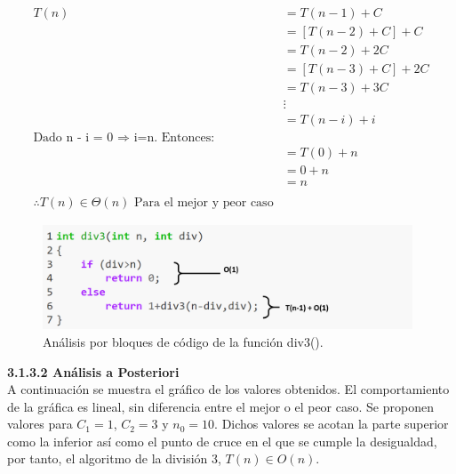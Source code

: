 \documentclass[12pt,twoside]{article}
\begin{document}
                \begin{align}
                \nonumber
                T(n)&=T(n-1)+C\nonumber\\
                &=[T(n-2)+C]+C\nonumber\\
                &=T(n-2)+2C\nonumber\\
                &=[T(n-3)+C]+2C\nonumber\\
                &=T(n-3)+3C\nonumber\\
                &\vdots\nonumber\\
                &=T(n-i)+i\nonumber\\
                \text{Dado n - i = 0 $\Rightarrow$ i=n. Entonces: }\nonumber\\
                &=T(0)+n\nonumber\\
                &=0+n\nonumber\\
                &=n\nonumber\\ \\
                \therefore T(n) \in \Theta(n) \text{ Para el mejor y peor caso}\nonumber
                \end{align}
                
                
                \begin{figure}[H]
                    \centering
                    \includegraphics[width=11cm]{imagenes/divc3.png}
                    \caption{Análisis por bloques de código de la función div3().}
                \end{figure}
                
                \newpage
                {\bf 3.1.3.2 Análisis a Posteriori}
                \\[0.3cm]
                
                A continuación se muestra el gráfico de los valores obtenidos. El comportamiento de la gráfica es lineal, sin diferencia entre el     mejor o  el peor caso.
                Se proponen valores para $C_{1}=1$, $C_{2}=3$ y $n_{0}=10$. Dichos valores se acotan la parte superior como la inferior as\'i como el punto de cruce en el que se cumple la desigualdad, por tanto, el algoritmo de la división 3, $T(n)\in O(n)$.
\end{document}
